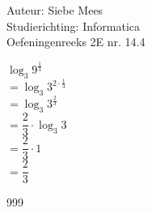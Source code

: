 \documentclass[a4paper]{article}
\begin{document}
  
\noindent \large Auteur: Siebe Mees \\
\noindent \large Studierichting: Informatica \\
\noindent \large Oefeningenreeks 2E nr. 14.4 \\

\medskip

\normalsize

$ \log_3 9^{ \tfrac{1}{3} } $ \\

$ = \log_3  3^{ 2 \cdot \tfrac{1}{3} } $ \\

$  = \log_3  3^{ \tfrac{2}{3} } $ \\

$ = \dfrac{2}{3} \cdot  \log_3 3 $\\

$ = \dfrac{2}{3} \cdot 1 $ \\

$ = \dfrac{2}{3} $ \\


\begin{thebibliography}{999}
\end{thebibliography}
\end{document}
